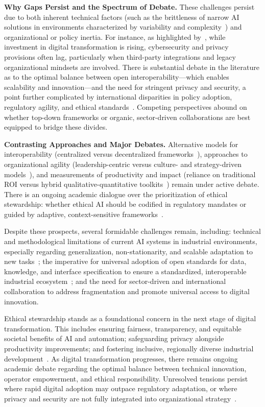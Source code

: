 \documentclass[sigconf]{acmart}
\begin{document}
\textbf{Why Gaps Persist and the Spectrum of Debate.} These challenges persist due to both inherent technical factors (such as the brittleness of narrow AI solutions in environments characterized by variability and complexity~\cite{ref19}\cite{ref45}) and organizational or policy inertia. For instance, as highlighted by~\cite{ref35}, while investment in digital transformation is rising, cybersecurity and privacy provisions often lag, particularly when third-party integrations and legacy organizational mindsets are involved. There is substantial debate in the literature as to the optimal balance between open interoperability---which enables scalability and innovation---and the need for stringent privacy and security, a point further complicated by international disparities in policy adoption, regulatory agility, and ethical standards~\cite{ref35}\cite{ref41}. Competing perspectives abound on whether top-down frameworks or organic, sector-driven collaborations are best equipped to bridge these divides.

\textbf{Contrasting Approaches and Major Debates.} Alternative models for interoperability (centralized versus decentralized frameworks~\cite{ref13}), approaches to organizational agility (leadership-centric versus culture- and strategy-driven models~\cite{ref93}), and measurements of productivity and impact (reliance on traditional ROI versus hybrid qualitative-quantitative toolkits~\cite{ref86}\cite{ref94}) remain under active debate. There is an ongoing academic dialogue over the prioritization of ethical stewardship: whether ethical AI should be codified in regulatory mandates or guided by adaptive, context-sensitive frameworks~\cite{ref35}\cite{ref90}.

Despite these prospects, several formidable challenges remain, including: technical and methodological limitations of current AI systems in industrial environments, especially regarding generalization, non-stationarity, and scalable adaptation to new tasks~\cite{ref19}\cite{ref20}\cite{ref54}; the imperative for universal adoption of open standards for data, knowledge, and interface specification to ensure a standardized, interoperable industrial ecosystem~\cite{ref13}\cite{ref86}; and the need for sector-driven and international collaboration to address fragmentation and promote universal access to digital innovation.

Ethical stewardship stands as a foundational concern in the next stage of digital transformation. This includes ensuring fairness, transparency, and equitable societal benefits of AI and automation; safeguarding privacy alongside productivity improvements; and fostering inclusive, regionally diverse industrial development~\cite{ref35}\cite{ref41}\cite{ref90}. As digital transformation progresses, there remains ongoing academic debate regarding the optimal balance between technical innovation, operator empowerment, and ethical responsibility. Unresolved tensions persist where rapid digital adoption may outpace regulatory adaptation, or where privacy and security are not fully integrated into organizational strategy~\cite{ref35}\cite{ref41}.
\end{document}
